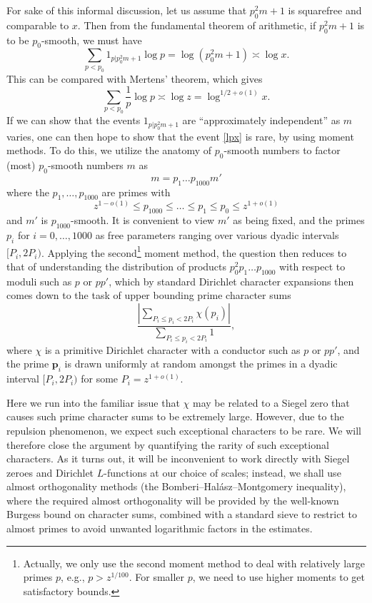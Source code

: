 \documentclass[12pt]{amsart}
\begin{document}
For sake of this informal discussion, let us assume that $p_0^2 m+1$ is squarefree and comparable to $x$.  Then from the fundamental theorem of arithmetic, if $p_0^2 m + 1$ is to be $p_0$-smooth, we must have
\begin{equation}\label{lpx}
 \sum_{p < p_0} 1_{p|p_0^2 m + 1} \log p = \log(p_0^2 m + 1) \asymp \log x.
\end{equation}
This can be compared with Mertens' theorem, which gives
$$ \sum_{p < p_0} \frac{1}{p} \log p \asymp \log z = \log^{1/2+o(1)} x.$$
If we can show that the events $1_{p|p_0^2 m + 1}$ are ``approximately independent'' as $m$ varies, one can then hope to show that the event
\eqref{lpx} is rare, by using moment methods.
To do this, we utilize the anatomy of $p_0$-smooth numbers to factor (most) $p_0$-smooth numbers $m$ as
$$ m = p_1 \dots p_{1000} m'$$
where the $p_1,\dots,p_{1000}$ are primes with
$$ z^{1-o(1)} \leq p_{1000} \leq \dots \leq p_1 \leq p_0 \leq z^{1+o(1)}$$
and $m'$ is $p_{1000}$-smooth.  It is convenient to view $m'$ as being fixed, and the primes $p_i$ for $i=0,\dots,1000$ as free parameters ranging over various dyadic intervals $[P_i,2P_i)$.  Applying the second\footnote{Actually, we only use the second moment method to deal with relatively large primes $p$, e.g., $p > z^{1/100}$.  For smaller $p$, we need to use higher moments to get satisfactory bounds.} moment method, the question then reduces to that of understanding the distribution of products $p_0^2 p_1 \dots p_{1000}$ with respect to moduli such as $p$ or $pp'$, which by standard Dirichlet character expansions then comes down to the task of upper bounding prime character sums
$$ \frac{|\sum_{P_i \leq p_i < 2P_i} \chi(p_i)|}{\sum_{P_i \leq p_i < 2P_i} 1},$$
where $\chi$ is a primitive Dirichlet character with a conductor such as $p$ or $pp'$, and the prime $\mathbf{p}_i$ is drawn uniformly at random amongst the primes in a dyadic interval $[P_i,2P_i)$ for some $P_i = z^{1+o(1)}$.

Here we run into the familiar issue that $\chi$ may be related to a Siegel zero that causes such prime character sums to be extremely large.  However, due to the repulsion phenomenon, we expect such exceptional characters to be rare.  We will therefore close the argument by quantifying the rarity of such exceptional characters.  As it turns out, it will be inconvenient to work directly with Siegel zeroes and Dirichlet $L$-functions at our choice of scales; instead, we shall use almost orthogonality methods (the Bomberi--Hal\'asz--Montgomery inequality), where the required almost orthogonality will be provided by the well-known Burgess bound on character sums, combined with a standard sieve to restrict to almost primes to avoid unwanted logarithmic factors in the estimates.
\end{document}
